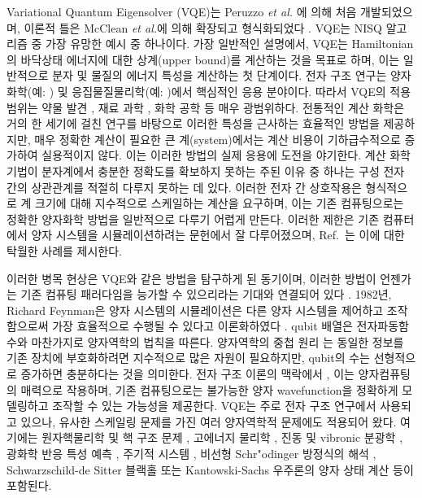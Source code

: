 Variational Quantum Eigensolver (VQE)는 Peruzzo {\it et al.} \cite{Peruzzo2014}에 의해 처음 개발되었으며, 이론적 틀은 McClean \textit{et al.}에 의해 확장되고 형식화되었다 \cite{mccleanTheoryVariationalHybrid2015}. VQE는 NISQ 알고리즘 중 가장 유망한 예시 중 하나이다. 가장 일반적인 설명에서, VQE는 Hamiltonian의 바닥상태 에너지에 대한 상계(upper bound)를 계산하는 것을 목표로 하며, 이는 일반적으로 분자 및 물질의 에너지 특성을 계산하는 첫 단계이다. 전자 구조 연구는 양자화학(예: \cite{Deglmann2014, WilliamsNoonan2017, Heifetz2020}) 및 응집물질물리학(예: \cite{Continentino2021, VanderVen2020})에서 핵심적인 응용 분야이다. 따라서 VQE의 적용 범위는 약물 발견 \cite{Cao2018_DD, Blunt2022}, 재료 과학 \cite{Lordi2021}, 화학 공학 \cite{Cao2019_QC} 등 매우 광범위하다. 전통적인 계산 화학은 거의 한 세기에 걸친 연구를 바탕으로 이러한 특성을 근사하는 효율적인 방법을 제공하지만, 매우 정확한 계산이 필요한 큰 계(system)에서는 계산 비용이 기하급수적으로 증가하여 실용적이지 않다. 이는 이러한 방법의 실제 응용에 도전을 야기한다. 계산 화학 기법이 분자계에서 충분한 정확도를 확보하지 못하는 주된 이유 중 하나는 구성 전자 간의 상관관계를 적절히 다루지 못하는 데 있다. 이러한 전자 간 상호작용은 형식적으로 계 크기에 대해 지수적으로 스케일하는 계산을 요구하며, 이는 기존 컴퓨팅으로는 정확한 양자화학 방법을 일반적으로 다루기 어렵게 만든다. 이러한 제한은 기존 컴퓨터에서 양자 시스템을 시뮬레이션하려는 문헌에서 잘 다루어졌으며, Ref.~\cite{Zhou2020}는 이에 대한 탁월한 사례를 제시한다.

이러한 병목 현상은 VQE와 같은 방법을 탐구하게 된 동기이며, 이러한 방법이 언젠가는 기존 컴퓨팅 패러다임을 능가할 수 있으리라는 기대와 연결되어 있다 \cite{Boixo2018, mccaskeyQuantumChemistryBenchmark2019}. 1982년, Richard Feynman은 양자 시스템의 시뮬레이션은 다른 양자 시스템을 제어하고 조작함으로써 가장 효율적으로 수행될 수 있다고 이론화하였다 \cite{Feynman1982}. qubit 배열은 전자파동함수와 마찬가지로 양자역학의 법칙을 따른다. 양자역학의 중첩 원리 \cite{Silverman2008, Ballentine2008}는 동일한 정보를 기존 장치에 부호화하려면 지수적으로 많은 자원이 필요하지만, qubit의 수는 선형적으로 증가하면 충분하다는 것을 의미한다. 전자 구조 이론의 맥락에서 \cite{Helgaker2000, Kratzer2019, Li2020_EST}, 이는 양자컴퓨팅의 매력으로 작용하며, 기존 컴퓨팅으로는 불가능한 양자 wavefunction을 정확하게 모델링하고 조작할 수 있는 가능성을 제공한다. VQE는 주로 전자 구조 연구에서 사용되고 있으나, 유사한 스케일링 문제를 가진 여러 양자역학적 문제에도 적용되어 왔다. 여기에는 원자핵물리학 \cite{Miceli2019, DiMatteo2021} 및 핵 구조 문제 \cite{Kiss2022, Romero2022}, 고에너지 물리학 \cite{Bauls2020, Bass2021, Bauer2022}, 진동 및 vibronic 분광학 \cite{McArdle2019_vibra, Sawaya2019, Ollitrault2020_vibrational, Jahangiri2020, Ltstedt2021, Sawaya2021}, 광화학 반응 특성 예측 \cite{Mitarai2020, Omiya2022}, 주기적 시스템 \cite{Liu2020, Yoshioka2022, Manrique2020}, 비선형 Schr{"{o}}dinger 방정식의 해석 \cite{Lubasch2020}, Schwarzschild-de Sitter 블랙홀 또는 Kantowski-Sachs 우주론의 양자 상태 계산 \cite{Joseph2022} 등이 포함된다.

